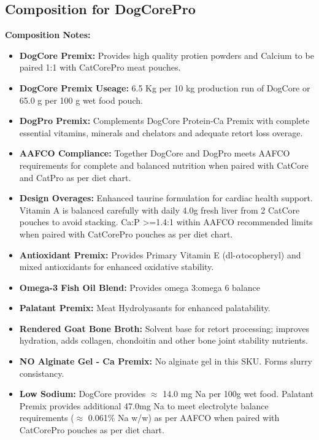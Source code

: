 \subsection*{Composition for DogCorePro}
\noindent\textbf{Composition Notes:}
\begin{itemize}
\item\textbf {DogCore Premix: } Provides high quality protien powders and Calcium to be paired 1:1 with CatCorePro meat pouches.
\item \textbf{DogCore Premix Useage: }6.5 Kg per 10 kg production run of DogCore or 65.0 g per 100 g wet food pouch.
\item \textbf{DogPro Premix: } Complements DogCore Protein-Ca Premix with complete essential vitamins, minerals and chelators and adequate retort loss overage. 
\item\textbf{AAFCO Compliance: } Together DogCore and DogPro meets AAFCO requirements for complete and balanced nutrition when paired with CatCore and CatPro as per diet chart. 
\item\textbf{Design Overages: }Enhanced taurine formulation for cardiac health support. Vitamin A is balanced carefully with daily 4.0g fresh liver from 2 CatCore pouches to avoid stacking. Ca:P >=1.4:1 within AAFCO recommended limits when paired with CatCorePro pouches as per diet chart. 
\item \textbf{Antioxidant Premix: } Provides Primary Vitamin E (dl-$\alpha$tocopheryl) and mixed antioxidants for enhanced oxidative stability.
\item \textbf{Omega-3 Fish Oil Blend:} Provides omega 3:omega 6  balance
\item \textbf{Palatant Premix: } Meat Hydrolyasants for enhanced palatability.
\item\textbf {Rendered Goat Bone Broth: } Solvent base for retort processing; improves hydration, adds collagen, chondoitin and other bone joint stability nutrients. 
\item \textbf{NO Alginate Gel - Ca Premix:} No alginate gel in this SKU. Forms slurry consistancy. 
\item \textbf{Low Sodium:} DogCore provides $\approx$ 14.0 mg Na per 100g wet food. Palatant Premix provides additional 47.0mg Na to meet electrolyte balance requirements ($\approx$ 0.061\% Na w/w) as per AAFCO when paired with CatCorePro pouches as per diet chart. 
\end{itemize}

